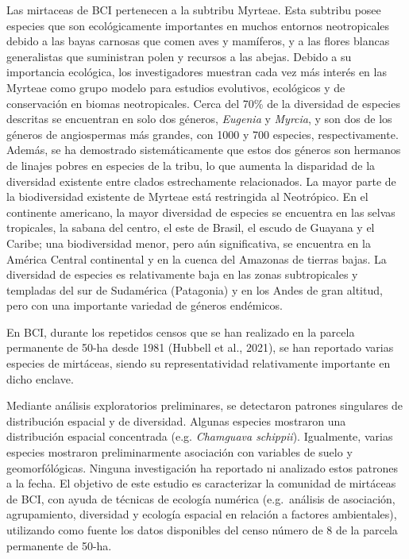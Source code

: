 \documentclass[11pt,]{article}
\begin{document}
Las mirtaceas de BCI pertenecen a la subtribu Myrteae. Esta subtribu
posee especies que son ecológicamente importantes en muchos entornos
neotropicales debido a las bayas carnosas que comen aves y mamíferos, y
a las flores blancas generalistas que suministran polen y recursos a las
abejas. Debido a su importancia ecológica, los investigadores muestran
cada vez más interés en las Myrteae como grupo modelo para estudios
evolutivos, ecológicos y de conservación en biomas neotropicales. Cerca
del 70\% de la diversidad de especies descritas se encuentran en solo
dos géneros, \emph{Eugenia} y \emph{Myrcia}, y son dos de los géneros de
angiospermas más grandes, con 1000 y 700 especies, respectivamente.
Además, se ha demostrado sistemáticamente que estos dos géneros son
hermanos de linajes pobres en especies de la tribu, lo que aumenta la
disparidad de la diversidad existente entre clados estrechamente
relacionados. La mayor parte de la biodiversidad existente de Myrteae
está restringida al Neotrópico. En el continente americano, la mayor
diversidad de especies se encuentra en las selvas tropicales, la sabana
del centro, el este de Brasil, el escudo de Guayana y el Caribe; una
biodiversidad menor, pero aún significativa, se encuentra en la América
Central continental y en la cuenca del Amazonas de tierras bajas. La
diversidad de especies es relativamente baja en las zonas subtropicales
y templadas del sur de Sudamérica (Patagonia) y en los Andes de gran
altitud, pero con una importante variedad de géneros endémicos.

En BCI, durante los repetidos censos que se han realizado en la parcela
permanente de 50-ha desde 1981 (Hubbell et al., 2021), se han reportado
varias especies de mirtáceas, siendo su representatividad relativamente
importante en dicho enclave.

Mediante análisis exploratorios preliminares, se detectaron patrones
singulares de distribución espacial y de diversidad. Algunas especies
mostraron una distribución espacial concentrada (e.g. \emph{Chamguava
schippii}). Igualmente, varias especies mostraron preliminarmente
asociación con variables de suelo y geomorfólógicas. Ninguna
investigación ha reportado ni analizado estos patrones a la fecha. El
objetivo de este estudio es caracterizar la comunidad de mirtáceas de
BCI, con ayuda de técnicas de ecología numérica (e.g.~análisis de
asociación, agrupamiento, diversidad y ecología espacial en relación a
factores ambientales), utilizando como fuente los datos disponibles del
censo número de 8 de la parcela permanente de 50-ha.
\end{document}
